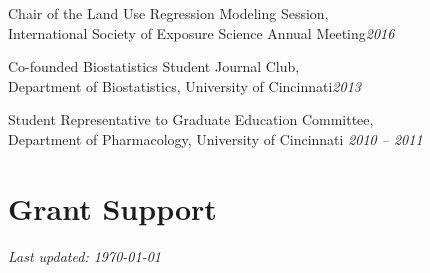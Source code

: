 \documentclass[margin,line]{res}
\newenvironment{list3}{
  \begin{list}{}{%
      \setlength{\itemsep}{0in}
      \setlength{\parsep}{0in} \setlength{\parskip}{0in}
      \setlength{\topsep}{0in} \setlength{\partopsep}{0in}
      \setlength{\leftmargin}{0in}}}{\end{list}}
\begin{document}
\begin{resume}
\begin{list3}
\item[] Chair of the Land Use Regression Modeling Session, \\International Society of Exposure Science Annual Meeting\hfill \textit{2016}
\item[] Co-founded Biostatistics Student Journal Club, \\Department of Biostatistics, University of Cincinnati\hfill \textit{2013}
\item[] Student Representative to Graduate Education Committee, \\Department of Pharmacology, University of Cincinnati \hfill \textit{2010 -- 2011}
\end{list3}

\section{\sc Grant Support}


\end{resume}

\vfill

\hfill \textit{Last updated: \today}
\end{document}

